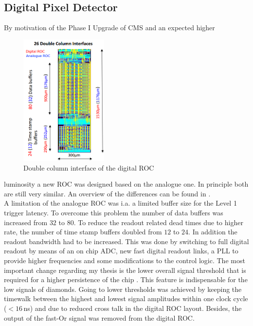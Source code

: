 \documentclass[british,11pt,a4paper]{memoir}
\begin{document}
\subsection{Digital Pixel Detector}\label{s23}
By motivation of the Phase I Upgrade of \ac{CMS} and an expected higher
\begin{figure}
	\vspace*{-10pt}
	\includegraphics[width=4.4cm]{DigRocPeri}
	\caption{Double column interface of the digital \ac{ROC} \cite{hits}}
	\label{p12}
	\vspace*{-10pt}
\end{figure} 
luminosity a new \ac{ROC} was designed based on the analogue one. In principle both are still very similar. An overview of the differences can be found in .\\
A limitation of the analogue \ac{ROC} was i.a. a limited buffer size for the Level 1 trigger latency. To overcome this problem the number of data buffers was increased from $32$ to $80$. To reduce the readout related dead times due to higher rate, the number of time stamp buffers doubled from $12$ to $24$. In addition the readout bandwidth had to be increased. This was done by switching to full digital readout by means of an on chip \ac{ADC}, new fast digital readout links, a \ac{PLL} to provide higher frequencies and some modifications to the control logic. The most important change regarding my thesis is the lower overall signal threshold that is required for a higher persistence of the chip \cite{hits}. This feature is indispensable for the low signals of diamonds. Going to lower thresholds was achieved by keeping the timewalk between the highest and lowest signal amplitudes within one clock cycle ($<16\,$ns) and due to reduced cross talk in the digital \ac{ROC} layout. Besides, the output of the fast-Or signal was removed from the digital \ac{ROC}.\\
\end{document}
